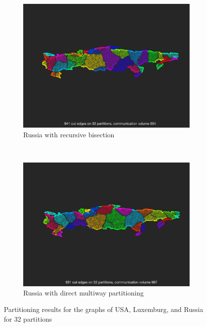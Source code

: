 \begin{figure}[H]
\begin{subfigure}{0.5\textwidth}
		\includegraphics[width=\textwidth]{./media/ru_metis.png}
		\caption{Russia with recursive bisection}
		\label{fig:ru_metis}
	\end{subfigure}%
	~
	\begin{subfigure}{0.5\textwidth}
		\includegraphics[width=\textwidth]{./media/ru_metis_k.png}
		\caption{Russia with direct multiway partitioning}
		\label{fig:ru_metis_k}
	\end{subfigure}

	\caption{Partitioning results for the graphs of USA, Luxemburg, and Russia
for 32 partitions}
	\label{fig:metis}
\end{figure}

